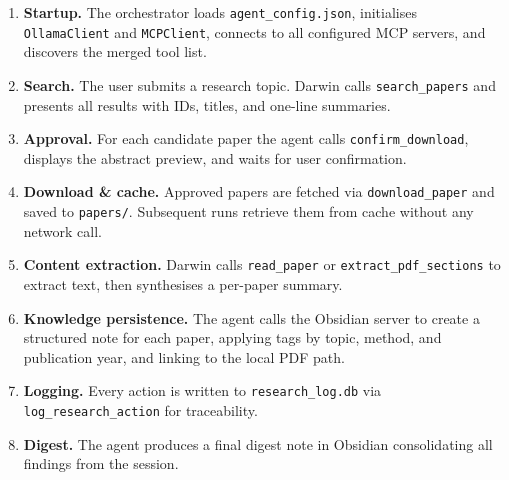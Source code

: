 \documentclass[12pt, a4paper]{article}
\newcommand{\code}[1]{\texttt{\small\color{darwinblue}#1}}
\begin{document}
\begin{enumerate}[leftmargin=2em, itemsep=5pt]
    \item \textbf{Startup.} The orchestrator loads \code{agent\_config.json}, initialises \code{OllamaClient} and \code{MCPClient}, connects to all configured MCP servers, and discovers the merged tool list.
    \item \textbf{Search.} The user submits a research topic. Darwin calls \code{search\_papers} and presents all results with IDs, titles, and one-line summaries.
    \item \textbf{Approval.} For each candidate paper the agent calls \code{confirm\_download}, displays the abstract preview, and waits for user confirmation.
    \item \textbf{Download \& cache.} Approved papers are fetched via \code{download\_paper} and saved to \code{papers/}. Subsequent runs retrieve them from cache without any network call.
    \item \textbf{Content extraction.} Darwin calls \code{read\_paper} or \code{extract\_pdf\_sections} to extract text, then synthesises a per-paper summary.
    \item \textbf{Knowledge persistence.} The agent calls the Obsidian server to create a structured note for each paper, applying tags by topic, method, and publication year, and linking to the local PDF path.
    \item \textbf{Logging.} Every action is written to \code{research\_log.db} via \code{log\_research\_action} for traceability.
    \item \textbf{Digest.} The agent produces a final digest note in Obsidian consolidating all findings from the session.
\end{enumerate}
\end{document}

